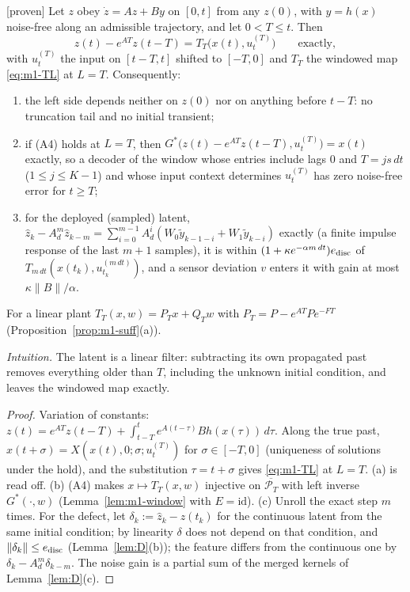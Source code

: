 \begin{lemma}\label{lem:m2-fir}
 [proven] Let $z$ obey $\dot z=Az+By$ on $[0,t]$ from any $z(0)$, with $y=h(x)$ noise-free along an
admissible trajectory, and let $0<T\le t$. Then
\[
z(t)-e^{AT}z(t-T)=T_T\big(x(t),u^{(T)}_t\big)\qquad\text{exactly},
\]
with $u^{(T)}_t$ the input on $[t-T,t]$ shifted to $[-T,0]$ and $T_T$ the windowed map \eqref{eq:m1-TL} at $L=T$.
Consequently:
\begin{enumerate}[label=(\alph*)]
\item the left side depends neither on $z(0)$ nor on anything before $t-T$: no truncation tail and no initial transient;
\item if (A4) holds at $L=T$, then $G^*\big(z(t)-e^{AT}z(t-T),u^{(T)}_t\big)=x(t)$ exactly, so a decoder of the window
whose entries include lags $0$ and $T=js\,dt$ ($1\le j\le K-1$) and whose input context determines $u^{(T)}_t$ has zero
noise-free error for $t\ge T$;
\item for the deployed (sampled) latent, $\hat z_k-A_d^m\hat z_{k-m}=\sum_{i=0}^{m-1}A_d^i(W_0\tilde y_{k-1-i}+W_1\tilde y_{k-i})$
exactly (a finite impulse response of the last $m+1$ samples), it is within $(1+\kappa e^{-\alpha m\,dt})e_{\rm disc}$ of
$T_{m\,dt}(x(t_k),u^{(m\,dt)}_{t_k})$, and a sensor deviation $v$ enters it with gain at most $\kappa\|B\|/\alpha$.
\end{enumerate}
For a linear plant $T_T(x,w)=P_Tx+Q_Tw$ with $P_T=P-e^{AT}Pe^{-FT}$ (Proposition~\ref{prop:m1-suff}(a)).
\end{lemma}
\emph{Intuition.} The latent is a linear filter: subtracting its own propagated past removes everything older than $T$,
including the unknown initial condition, and leaves the windowed map exactly.
\begin{proof}
Variation of constants: $z(t)=e^{AT}z(t-T)+\int_{t-T}^te^{A(t-\tau)}Bh(x(\tau))\,d\tau$. Along the true past,
$x(t+\sigma)=X(x(t),0;\sigma;u^{(T)}_t)$ for $\sigma\in[-T,0]$ (uniqueness of solutions under the hold), and the
substitution $\tau=t+\sigma$ gives \eqref{eq:m1-TL} at $L=T$. (a) is read off. (b) (A4) makes $x\mapsto T_T(x,w)$ injective
on $\overline{\mathcal P_T}$ with left inverse $G^*(\cdot,w)$ (Lemma~\ref{lem:m1-window} with $E=\mathrm{id}$). (c) Unroll
the exact step $m$ times. For the defect, let $\delta_k:=\hat z_k-z(t_k)$ for the continuous latent from the same
initial condition; by linearity $\delta$ does not depend on that condition, and $\|\delta_k\|\le e_{\rm disc}$
(Lemma~\ref{lem:D}(b)); the feature differs from the continuous one by $\delta_k-A_d^m\delta_{k-m}$. The noise gain is a
partial sum of the merged kernels of Lemma~\ref{lem:D}(c).
\end{proof}
